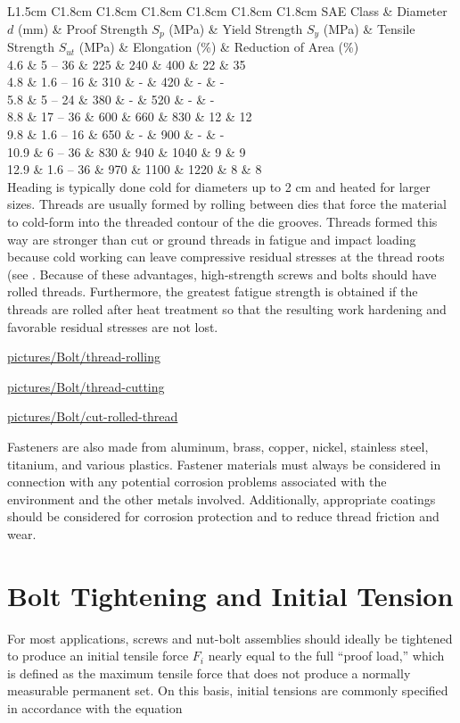 \documentclass[a4paper,openany,12pt]{book}
\begin{document}
{{ L1.5cm C1.8cm C1.8cm C1.8cm C1.8cm C1.8cm C1.8cm SAE Class \& Diameter
\(d\) (mm) \& Proof Strength \(S_p\) (MPa) \& Yield Strength \(S_y\) (MPa) \&
Tensile Strength \(S_{ut}\) (MPa) \& Elongation (\%) \& Reduction of Area
(\%)\\
4.6 \& 5 -- 36 \& 225 \& 240 \& 400 \& 22 \& 35\\
4.8 \& 1.6 -- 16 \& 310 \& - \& 420 \& - \& -\\
5.8 \& 5 -- 24 \& 380 \& - \& 520 \& - \& -\\
8.8 \& 17 -- 36 \& 600 \& 660 \& 830 \& 12 \& 12\\
9.8 \& 1.6 -- 16 \& 650 \& - \& 900 \& - \& -\\
10.9 \& 6 -- 36 \& 830 \& 940 \& 1040 \& 9 \& 9\\
12.9 \& 1.6 -- 36 \& 970 \& 1100 \& 1220 \& 8 \& 8\\

Heading is typically done cold for diameters up to 2 cm and heated for
larger sizes. Threads are usually formed by rolling between dies that
force the material to cold-form into the threaded contour of the die
grooves. Threads formed this way are stronger than cut or ground threads
in fatigue and impact loading because cold working can leave compressive
residual stresses at the thread roots (see . Because of these
advantages, high-strength screws and bolts should have rolled threads.
Furthermore, the greatest fatigue strength is obtained if the threads
are rolled after heat treatment so that the resulting work hardening and
favorable residual stresses are not lost.


\url{pictures/Bolt/thread-rolling}


\url{pictures/Bolt/thread-cutting}


\url{pictures/Bolt/cut-rolled-thread}

Fasteners are also made from aluminum, brass, copper, nickel, stainless
steel, titanium, and various plastics. Fastener materials must always be
considered in connection with any potential corrosion problems
associated with the environment and the other metals involved.
Additionally, appropriate coatings should be considered for corrosion
protection and to reduce thread friction and wear.

\section{Bolt Tightening and Initial Tension}
\label{bolt-tightening-and-initial-tension}
For most applications, screws and nut-bolt assemblies should ideally be
tightened to produce an initial tensile force \(F_i\) nearly equal to the
full ``proof load,'' which is defined as the maximum tensile force that
does not produce a normally measurable permanent set. On this basis,
initial tensions are commonly specified in accordance with the equation

}}
\end{document}

